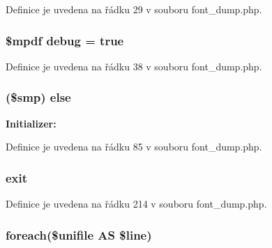 Definice je uvedena na řádku 29 v souboru font\-\_\-dump.\-php.

\hypertarget{font__dump_8php_a200a436f1833a712239f1ae5bec608db}{
\subsubsection[{debug}]{\setlength{\rightskip}{0pt plus 5cm}\$mpdf debug = true}}\label{font__dump_8php_a200a436f1833a712239f1ae5bec608db}


Definice je uvedena na řádku 38 v souboru font\-\_\-dump.\-php.

\hypertarget{font__dump_8php_aa378ca8ac707e59c3887cf4c96cc1724}{
\subsubsection[{else}]{ (\$smp) else}}\label{font__dump_8php_aa378ca8ac707e59c3887cf4c96cc1724}
{\bfseries Initializer\-:}


Definice je uvedena na řádku 85 v souboru font\-\_\-dump.\-php.

\hypertarget{font__dump_8php_a6733eb5f605d09eaede9845835d71c4e}{
\subsubsection[{exit}]{\setlength{\rightskip}{0pt plus 5cm}exit}}\label{font__dump_8php_a6733eb5f605d09eaede9845835d71c4e}


Definice je uvedena na řádku 214 v souboru font\-\_\-dump.\-php.

\hypertarget{font__dump_8php_afa3e0d7f4c07331bb8ee7bd7e2008de6}{
\subsubsection[{foreach}]{\setlength{\rightskip}{0pt plus 5cm}foreach(\$unifile A\-S \$line)}}\label{font__dump_8php_afa3e0d7f4c07331bb8ee7bd7e2008de6}


